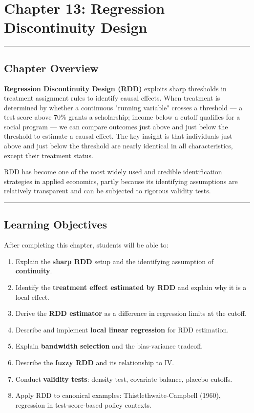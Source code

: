 \chapter{Chapter 13: Regression Discontinuity Design}

\medskip\hrule\medskip

\section{Chapter Overview}

\textbf{Regression Discontinuity Design (RDD)} exploits sharp thresholds in treatment assignment rules to identify causal effects. When treatment is determined by whether a continuous "running variable" crosses a threshold --- a test score above 70\% grants a scholarship; income below a cutoff qualifies for a social program --- we can compare outcomes just above and just below the threshold to estimate a causal effect. The key insight is that individuals just above and just below the threshold are nearly identical in all characteristics, except their treatment status.

RDD has become one of the most widely used and credible identification strategies in applied economics, partly because its identifying assumptions are relatively transparent and can be subjected to rigorous validity tests.

\medskip\hrule\medskip

\section{Learning Objectives}

After completing this chapter, students will be able to:

\begin{enumerate}
\item Explain the \textbf{sharp RDD} setup and the identifying assumption of \textbf{continuity}.
\item Identify the \textbf{treatment effect estimated by RDD} and explain why it is a local effect.
\item Derive the \textbf{RDD estimator} as a difference in regression limits at the cutoff.
\item Describe and implement \textbf{local linear regression} for RDD estimation.
\item Explain \textbf{bandwidth selection} and the bias-variance tradeoff.
\item Describe the \textbf{fuzzy RDD} and its relationship to IV.
\item Conduct \textbf{validity tests}: density test, covariate balance, placebo cutoffs.
\item Apply RDD to canonical examples: Thistlethwaite-Campbell (1960), regression in test-score-based policy contexts.
\end{enumerate}

